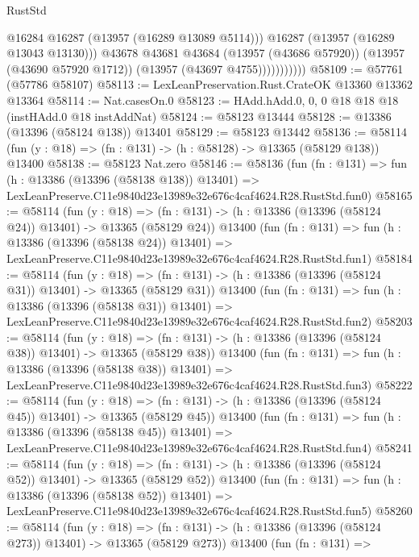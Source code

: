 \begin{lexlean}{RustStd}
\begin{coremodule}
                          @16284
                          @16287
                          (@13957 (@16289 @13089 @5114)))
                        @16287
                        (@13957 (@16289 @13043 @13130)))
                      @43678
                      @43681
                      @43684
                      (@13957 (@43686 @57920))
                      (@13957 (@43690 @57920 @1712))
                      (@13957 (@43697 @4755)))))))))))
@58109 := @57761 (@57786 @58107)
@58113 := LexLeanPreservation.Rust.CrateOK @13360 @13362 @13364
@58114 := Nat.casesOn.{0}
@58123 := HAdd.hAdd.{0, 0, 0} @18 @18 @18 (instHAdd.{0} @18 instAddNat)
@58124 := @58123 @13444
@58128 := @13386 (@13396 (@58124 @138)) @13401
@58129 := @58123 @13442
@58136 := @58114 (fun (y : @18) => (fn : @131) -> (h : @58128) -> @13365 (@58129 @138)) @13400
@58138 := @58123 Nat.zero
@58146 := @58136
    (fun (fn : @131) =>
    fun (h : @13386 (@13396 (@58138 @138)) @13401) =>
    LexLeanPreserve.C11e9840d23e13989e32e676c4caf4624.R28.RustStd.fun0)
@58165 := @58114
    (fun (y : @18) =>
    (fn : @131) -> (h : @13386 (@13396 (@58124 @24)) @13401) -> @13365 (@58129 @24))
    @13400
    (fun (fn : @131) =>
    fun (h : @13386 (@13396 (@58138 @24)) @13401) =>
    LexLeanPreserve.C11e9840d23e13989e32e676c4caf4624.R28.RustStd.fun1)
@58184 := @58114
    (fun (y : @18) =>
    (fn : @131) -> (h : @13386 (@13396 (@58124 @31)) @13401) -> @13365 (@58129 @31))
    @13400
    (fun (fn : @131) =>
    fun (h : @13386 (@13396 (@58138 @31)) @13401) =>
    LexLeanPreserve.C11e9840d23e13989e32e676c4caf4624.R28.RustStd.fun2)
@58203 := @58114
    (fun (y : @18) =>
    (fn : @131) -> (h : @13386 (@13396 (@58124 @38)) @13401) -> @13365 (@58129 @38))
    @13400
    (fun (fn : @131) =>
    fun (h : @13386 (@13396 (@58138 @38)) @13401) =>
    LexLeanPreserve.C11e9840d23e13989e32e676c4caf4624.R28.RustStd.fun3)
@58222 := @58114
    (fun (y : @18) =>
    (fn : @131) -> (h : @13386 (@13396 (@58124 @45)) @13401) -> @13365 (@58129 @45))
    @13400
    (fun (fn : @131) =>
    fun (h : @13386 (@13396 (@58138 @45)) @13401) =>
    LexLeanPreserve.C11e9840d23e13989e32e676c4caf4624.R28.RustStd.fun4)
@58241 := @58114
    (fun (y : @18) =>
    (fn : @131) -> (h : @13386 (@13396 (@58124 @52)) @13401) -> @13365 (@58129 @52))
    @13400
    (fun (fn : @131) =>
    fun (h : @13386 (@13396 (@58138 @52)) @13401) =>
    LexLeanPreserve.C11e9840d23e13989e32e676c4caf4624.R28.RustStd.fun5)
@58260 := @58114
    (fun (y : @18) =>
    (fn : @131) -> (h : @13386 (@13396 (@58124 @273)) @13401) -> @13365 (@58129 @273))
    @13400
    (fun (fn : @131) =>

\end{coremodule}
\end{lexlean}
